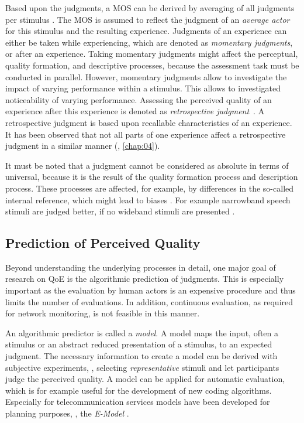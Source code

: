 Based upon the judgments, a \acf{MOS} can be derived by averaging of all judgments per stimulus \citep{itu-t_recommendation_p.800.2_mean_2013}.
The \ac{MOS} is assumed to reflect the judgment of an \emph{average actor} for this stimulus and the resulting experience.
Judgments of an experience can either be taken while experiencing, which are denoted as \emph{momentary judgments}, or after an experience.
Taking momentary judgments might affect the perceptual, quality formation, and descriptive processes, because the assessment task must be conducted in parallel. %
However, momentary judgments allow to investigate the impact of varying performance within a stimulus.
This allows to investigated noticeability of varying performance.
Assessing the perceived quality of an experience after this experience is denoted as \emph{retrospective judgment}~\citep[][]{weiss_temporal_2014}.
A retrospective judgment is based upon recallable characteristics of an experience.
It has been observed that not all parts of one experience affect a retrospective judgment in a similar manner (\cf, \autoref{chap:04}).

It must be noted that a judgment cannot be considered as absolute in terms of universal, because it is the result of the quality formation process and description process.
These processes are affected, for example, by differences in the so-called internal reference, which might lead to biases \citep[][]{zielinski_biases_2008, pitrey_aligning_2011}.
For example narrowband speech stimuli are judged better, if no wideband stimuli are presented \citep[][]{koster_comparison_2015}.

\subsection{Prediction of Perceived Quality}
Beyond understanding the underlying processes in detail, one major goal of research on \ac{QoE} is the algorithmic prediction of judgments.
This is especially important as the evaluation by human actors is an expensive procedure and thus limits the number of evaluations.
In addition, continuous evaluation, as required for network monitoring, is not feasible in this manner.

An algorithmic predictor is called a \emph{model}.
A model maps the input, often a stimulus or an abstract reduced presentation of a stimulus, to an expected judgment.
The necessary information to create a model can be derived with subjective experiments, \ie, selecting \emph{representative} stimuli and let participants judge the perceived quality.
A model can be applied for automatic evaluation, which is for example useful for the development of new coding algorithms.
Especially for telecommunication services models have been developed for planning purposes, \eg, the \emph{E-Model} \citep{itu-t_recommendation_g.107_e-model_2015}.

